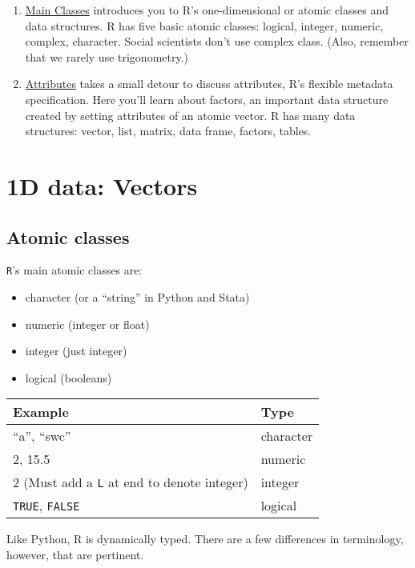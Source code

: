 \documentclass[
]{book}
\providecommand{\tightlist}{%
  \setlength{\itemsep}{0pt}\setlength{\parskip}{0pt}}
\begin{document}
\begin{enumerate}
\def\labelenumi{\arabic{enumi}.}
\item
  \protect\hyperlink{main-classes}{Main Classes} introduces you to R's one-dimensional or atomic classes and data structures. R has five basic atomic classes: logical, integer, numeric, complex, character. Social scientists don't use complex class. (Also, remember that we rarely use trigonometry.)
\item
  \protect\hyperlink{attributes}{Attributes} takes a small detour to discuss attributes, R's flexible metadata specification. Here you'll learn about factors, an important data structure created by setting attributes of an atomic vector. R has many data structures: vector, list, matrix, data frame, factors, tables.
\end{enumerate}

\hypertarget{d-data-vectors}{%
\section{1D data: Vectors}\label{d-data-vectors}}

\hypertarget{atomic-classes}{%
\subsection{Atomic classes}\label{atomic-classes}}

\texttt{R}'s main atomic classes are:

\begin{itemize}
\tightlist
\item
  character (or a ``string'' in Python and Stata)
\item
  numeric (integer or float)
\item
  integer (just integer)
\item
  logical (booleans)
\end{itemize}

\begin{longtable}[]{@{}ll@{}}
\toprule
Example & Type\tabularnewline
\midrule
\endhead
``a'', ``swc'' & character\tabularnewline
2, 15.5 & numeric\tabularnewline
2 (Must add a \texttt{L} at end to denote integer) & integer\tabularnewline
\texttt{TRUE}, \texttt{FALSE} & logical\tabularnewline
\bottomrule
\end{longtable}

Like Python, R is dynamically typed. There are a few differences in terminology, however, that are pertinent.
\end{document}

